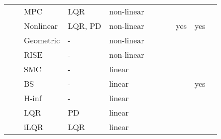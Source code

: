 \begin{landscape}
{\begin{table}[!htbp]
\begin{tabularx}{\linewidth}{@{}lllllllllll@{}}
            \citet{Trachte2015}          & \citeyear{Trachte2015}          & \gls{MPC}                  & \gls{LQR}              & non-linear           &                    &                  &                     &                    &                    &                  \\
            \citet{Liang2021}            & \citeyear{Liang2021}            & Nonlinear                  & \gls{LQR}, \gls{PD}    & non-linear           &                    &                  &                     & yes                & yes                &                  \\
            \citet{Zeng2019a}            & \citeyear{Zeng2019a}            & Geometric                  & -                      & non-linear           &                    &                  &                     &                    &                    &                  \\
            \citet{Yang2018}             & \citeyear{Yang2018}             & \gls{RISE}                 & -                      & non-linear           &                    &                  &                     &                    &                    &                  \\
            \citet{Martinez-Vasquez2020} & \citeyear{Martinez-Vasquez2020} & \gls{SMC}                  & -                      & linear               &                    &                  &                     &                    &                    &                  \\
            \citet{Mosco-Luciano2020}    & \citeyear{Mosco-Luciano2020}    & \gls{BS}                   & -                      & linear               &                    &                  &                     &                    & yes                &                  \\
            \citet{Rigatos2018}          & \citeyear{Rigatos2018}          & \gls{H-inf}                & -                      & linear               &                    &                  &                     &                    &                    &                  \\
            \citet{Alothman2015}         & \citeyear{Alothman2015}         & \gls{LQR}                  & \gls{PD}               & linear               &                    &                  &                     &                    &                    &                  \\
            \citet{Alothman2016}         & \citeyear{Alothman2016}         & \gls{iLQR}                 & \gls{LQR}              & linear               &                    &                  &                     &                    &                    &                  \\
    \end{tabularx}
    \label{tbl:lit}
\end{table}

}
\end{landscape}

